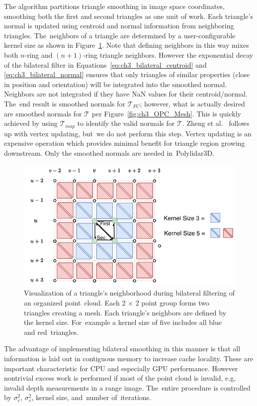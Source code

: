 The algorithm partitions triangle smoothing in image space coordinates, smoothing both the first and second triangles as one unit of work. Each triangle's normal is updated using centroid and normal information from neighboring triangles. The~neighbors of a triangle are determined by a user-configurable kernel size as shown in Figure~\ref{fig:ch3_smooth_bilateral}.  Note that defining neighbors in this way mixes both $n$-ring and $(n+1)$-ring triangle neighbors. However the exponential decay of the bilateral filter in Equations~\ref{eq:ch3_bilateral_centroid} and \ref{eq:ch3_bilateral_normal} ensures that only triangles of similar properties (close in position and orientation) will be integrated into the smoothed normal. Neighbors are not integrated if they have NaN values for their centroid/normal. The~end result is smoothed normals for $\mathcal{T}_{FC}$; however, what is actually desired are smoothed normals for $\mathcal{T}$ per Figure~\ref{fig:ch3_OPC_Mesh}. This is quickly achieved by using $\mathcal{T}_{map}$ to identify the valid normals for $\mathcal{T}$. Zheng et al.~\cite{zheng_bilateral_2011} follows up with vertex updating, but~we do not perform this step. Vertex updating is an expensive operation which provides minimal benefit for triangle region growing downstream. Only the smoothed normals are needed in~Polylidar3D. 


\begin{figure}[H]
    \centering
    \includegraphics[width=.60\linewidth]{chapter_3_polylidar3d/imgs/OPCHalfEdge-BilateralFilter.pdf}
    \caption[Visualization of a triangle's neighborhood during bilateral filtering]{Visualization of a triangle's neighborhood during bilateral filtering of an organized point~cloud.  Each 2 $\times$ 2 point group forms two triangles creating a mesh. Each triangle's neighbors are defined by the kernel size. For~example a kernel size of five includes all blue and red~triangles.}
    \label{fig:ch3_smooth_bilateral}
\end{figure}

The advantage of implementing bilateral smoothing in this manner is that all information is laid out in contiguous memory to increase cache locality. These are important characteristic for CPU and especially GPU performance. However nontrivial excess work is performed if most of the point cloud is invalid, e.g, invalid depth measurements in a range image. The~entire procedure is controlled by $\sigma_c^2$, $\sigma_s^2$, kernel size, and~number of~iterations.


